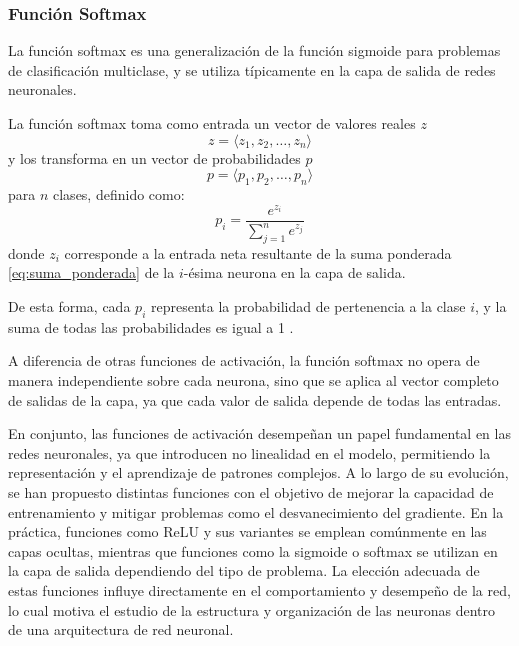 \subsubsection{Función Softmax}
La función softmax es una generalización de la función sigmoide para problemas de
clasificación multiclase, y se utiliza típicamente en la capa de salida de redes neuronales.
\medskip

La función softmax toma como entrada un vector de valores reales
$z$
\begin{equation}
    z=\langle z_{1}, z_{2}, \dots, z_{n}\rangle
\end{equation} y los transforma en un vector de
probabilidades $p$
\begin{equation}
    p=\langle p_{1}, p_{2}, \dots, p_{n}\rangle
\end{equation}
para $n$ clases, definido como:
\begin{equation}
    p_{i} = \frac{e^{z_{i}}}{\sum_{j=1}^{n} e^{z_{j}}}
    \label{eq:softmax}
\end{equation}
donde $z_i$ corresponde a la entrada neta resultante de la suma ponderada \eqref{eq:suma_ponderada} 
de la $i$-ésima neurona en la capa de salida.
\medskip

De esta forma, cada $p_i$ representa la probabilidad de pertenencia a la clase $i$, y la suma
de todas las probabilidades es igual a 1 \parencite{franke2023softmax}.
\medskip

A diferencia de otras funciones de activación, la función softmax no opera de manera
independiente sobre cada neurona, sino que se aplica al vector completo de salidas de
la capa, ya que cada valor de salida depende de todas las entradas.
\medskip

En conjunto, las funciones de activación desempeñan un papel fundamental en las redes neuronales,
ya que introducen no linealidad en el modelo, permitiendo la representación y el aprendizaje de
patrones complejos. A lo largo de su evolución, se han propuesto distintas funciones con el objetivo
de mejorar la capacidad de entrenamiento y mitigar problemas como el desvanecimiento del gradiente.
En la práctica, funciones como ReLU y sus variantes se emplean comúnmente en las capas ocultas,
mientras que funciones como la sigmoide o softmax se utilizan en la capa de salida dependiendo del
tipo de problema. La elección adecuada de estas funciones influye directamente en el comportamiento
y desempeño de la red, lo cual motiva el estudio de la estructura y organización de las neuronas
dentro de una arquitectura de red neuronal.

